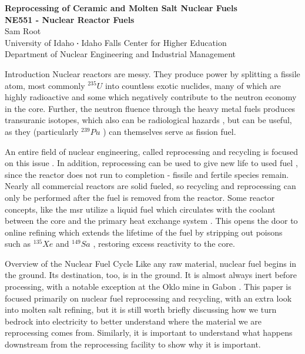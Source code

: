 \documentclass[11pt,a4paper]{article}
\makeatletter
\newcommand*\sq{\mathbin{\vcenter{\hbox{\rule{.3ex}{.3ex}}}}} %
\newcommand{\acf}{\acrfull} %
\renewcommand\section{%
    \@startsection{section}{1}{\z@ }{0.50\baselineskip}{0.25\baselineskip}
    {\normalfont \normalsize \bfseries}}%
\newcommand{\Xe}[1][135]{$^{#1}Xe$ }
\newcommand{\Sa}[1][149]{$^{#1}Sa$ }
\newcommand{\U}[1][]{$^{#1}U$ }
\newcommand{\Pu}[1][239]{$^{#1}Pu$ }
\makeatother
\begin{document}
{\centering
    \textbf{Reprocessing of Ceramic and Molten Salt Nuclear Fuels\\
    NE551 - Nuclear Reactor Fuels\\
    }
    Sam Root\\
    University of Idaho $\sq$ Idaho Falls Center for Higher Education\\
    Department of Nuclear Engineering and Industrial Management
\par
}

\noindent\makebox[\linewidth]{\rule{\textwidth}{0.5pt}} %


\section{Introduction}
Nuclear reactors are messy. They produce power by splitting a fissile atom, most commonly \U[235] into countless exotic nuclides, many of which are highly radioactive and some which negatively contribute to the neutron economy in the core. Further, the neutron fluence through the heavy metal fuels produces transuranic isotopes, which also can be radiological hazards \cite{intro}, but can be useful, as they (particularly \Pu) can themselves serve as fission fuel.

An entire field of nuclear engineering, called reprocessing and recycling is focused on this issue \cite[Ch. 7]{cycle}. In addition, reprocessing can be used to give new life to used fuel \cite[Ch. 10]{chem}, since the reactor does not run to completion - fissile and fertile species remain. Nearly all commercial reactors are solid fueled, so recycling and reprocessing can only be performed after the fuel is removed from the reactor. Some reactor concepts, like the \acf{msr} utilize a liquid fuel which circulates with the coolant between the core and the primary heat exchange system \cite[Ch. 2]{fuel}. This opens the door to online refining which extends the lifetime of the fuel by stripping out poisons such as \Xe and \Sa, restoring excess reactivity to the core. 

\section{Overview of the Nuclear Fuel Cycle}
Like any raw material, nuclear fuel begins in the ground. Its destination, too, is in the ground. It is almost always inert before processing, with a notable exception at the Oklo mine in Gabon \cite{Oklo}. This paper is focused primarily on nuclear fuel reprocessing and recycling, with an extra look into molten salt refining, but it is still worth briefly discussing how we turn bedrock into electricity to better understand where the material we are reprocessing comes from. Similarly, it is important to understand what happens downstream from the reprocessing facility to show why it is important.
\end{document}
